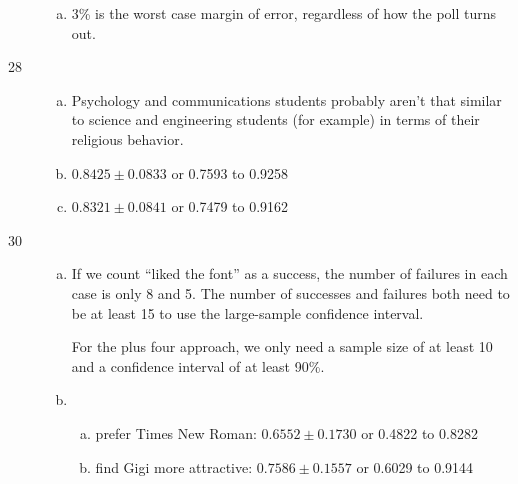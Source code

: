 \documentclass[letterpaper]{exam}
\begin{document}
\begin{description}
\begin{enumerate}[(a)]
          \item 3\% is the worst case margin of error, regardless of how the poll
            turns out.

        \end{enumerate}

      \item[28]
        \begin{enumerate}[(a)]
          \item Psychology and communications students probably aren't that similar
            to science and engineering students (for example) in terms of their
            religious behavior.

          \item $0.8425 \pm 0.0833$ or 0.7593 to 0.9258

          \item $0.8321 \pm 0.0841$ or 0.7479 to 0.9162

        \end{enumerate}

      \item[30]
        \begin{enumerate}[(a)]
          \item If we count ``liked the font'' as a success, the number of failures
            in each case is only 8 and 5. The number of successes and failures both
            need to be at least 15 to use the large-sample confidence interval.

            For the plus four approach, we only need a sample size of at least 10 and
            a confidence interval of at least 90\%.

          \item 
            \begin{enumerate}[(a)]
              \item prefer Times New Roman: $0.6552 \pm 0.1730$ or
                0.4822 to 0.8282

              \item find Gigi more attractive: $0.7586 \pm 0.1557$ or
                0.6029 to 0.9144


\end{enumerate}
\end{enumerate}
\end{description}
\end{document}
